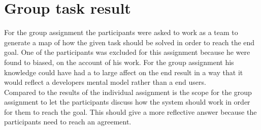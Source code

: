 \section{Group task result}
\label{GroupTaskResults}
For the group assignment the participants were asked to work as a team to generate a map of how the given task should be solved in order to reach the end goal. One of the participants was excluded for this assignment because he were found to biased, on the account of his work. For the group assignment his knowledge could have had a to large affect on the end result in a way that it would reflect a developers mental model rather than a end users.\\ 
Compared to the results of the individual assignment is the scope for the group assignment to let the participants discuss how the system should work in order for them to reach the goal. This should give a more reflective answer because the participants need to reach an agreement.\\


